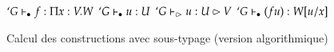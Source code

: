 \def\AppI{
\TAX{App}
{$`G \seq f : \Pi x : V. W $}
{$`G \seq u : U$}
{$`G \judgesub u : U \impsub V $}
{$`G \seq (f u) : W [ u / x ]$}
{}
}

\begin{figure}[h]
  \begin{center}
    \def\fCenter{\wf}
    \def\type{\typei}
    
    \WfAtom\DP    
    \WfVar\DP
    
    \def\fCenter{\typei}
    \vspace{\infvspace}
    \PropSet\DP
    
    \vspace{\infvspace}
    \Var\DP
    
    \vspace{\infvspace}
    \Prod\DP
    
    \vspace{\infvspace}
    \Abs\DP

    \vspace{\infvspace}
    \AppI\DP

    \vspace{\infvspace}
    \LetIn\DP
    
    \vspace{\infvspace}
    \SigmaR\DP

    \vspace{\infvspace}
    \Sum\DP
    
    \vspace{\infvspace}
    \LetSum\DP
    
  \end{center}
  \label{typing-algo-rules}
  \caption{Calcul des constructions avec sous-typage (version algorithmique)}
\end{figure}


